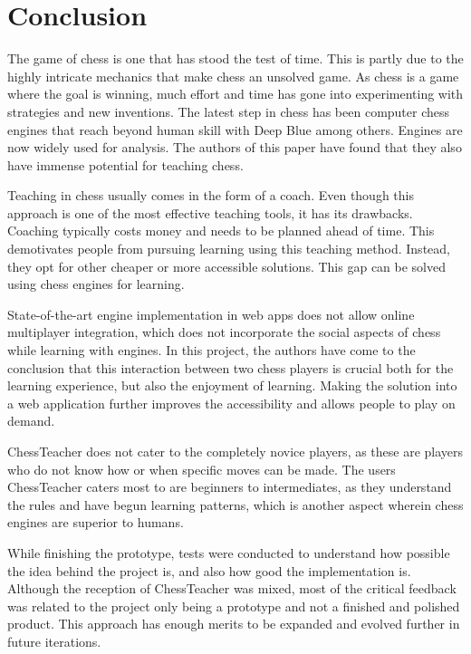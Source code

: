 \chapter{Conclusion}\label{ch:conclusion}

The game of chess is one that has stood the test of time.
This is partly due to the highly intricate mechanics that make chess an unsolved game.
As chess is a game where the goal is winning, much effort and time has gone into experimenting with
strategies and new inventions.
The latest step in chess has been computer chess engines that reach beyond human skill with Deep Blue among others.
Engines are now widely used for analysis.
The authors of this paper have found that they also have immense potential for teaching chess.

Teaching in chess usually comes in the form of a coach.
Even though this approach is one of the most effective teaching tools, it has its drawbacks.
Coaching typically costs money and needs to be planned ahead of time.
This demotivates people from pursuing learning using this teaching method.
Instead, they opt for other cheaper or more accessible solutions.
This gap can be solved using chess engines for learning.

State-of-the-art engine implementation in web apps does not allow online multiplayer integration, which does not
incorporate the social aspects of chess while learning with engines.
In this project, the authors have come to the conclusion that this interaction between two chess players is crucial both
for the learning experience, but also the enjoyment of learning.
Making the solution into a web application further improves the accessibility and allows people to play on demand.

ChessTeacher does not cater to the completely novice players, as these are players who do not know how or when specific
moves can be made.
The users ChessTeacher caters most to are beginners to intermediates, as they understand the rules and have begun
learning patterns, which is another aspect wherein chess engines are superior to humans.

While finishing the prototype, tests were conducted to understand how possible the idea behind the project is, and also
how good the implementation is.
Although the reception of ChessTeacher was mixed, most of the critical feedback was related to the project only being
a prototype and not a finished and polished product.
This approach has enough merits to be expanded and evolved further in future iterations.

